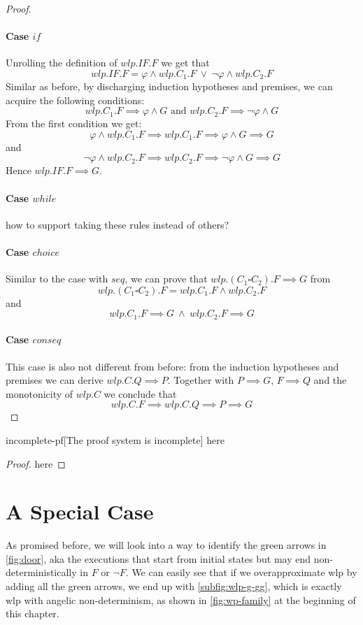 \begin{proof}
	\paragraph{Case $if$}
	Unrolling the definition of $wlp.IF.F$ we get that 
	$$wlp.IF.F = \varphi\wedge wlp.C_1.F\ \vee\ \neg\varphi\wedge wlp.C_2.F$$ 
	Similar as before, by discharging induction hypotheses and premises, we can acquire the following conditions: 
	$$wlp.C_1.F\implies\varphi\wedge G \text{ and }
	 wlp.C_2.F\implies\neg\varphi\wedge G $$
	From the first condition we get: 
	$$\varphi\wedge wlp.C_1.F\implies wlp.C_1.F \implies \varphi\wedge G\implies G$$
	and 
	$$\neg\varphi\wedge wlp.C_2.F\implies wlp.C_2.F \implies \neg\varphi\wedge G\implies G$$
	Hence $wlp.IF.F \implies G$. 
	\paragraph{Case $while$}
	\colorbox{red!30}{
		how to support taking these rules instead of others? 
	}%
	\paragraph{Case $choice$} Similar to the case with $seq$, we can prove that $wlp.(C_1\square C_2).F \implies G$ from 
	$$wlp.(C_1\square C_2).F = wlp.C_1.F \wedge wlp.C_2.F$$
	and 
	$$wlp.C_1.F \implies G\ \wedge\ wlp.C_2.F \implies G$$

	\paragraph{Case $conseq$}
	This case is also not different from before: from the induction hypotheses and premises we can derive $wlp.C.Q \implies P$. 
	Together with $P\implies G$, $F\implies Q$ and the monotonicity of $wlp.C$ we conclude that 
	$$wlp.C.F\implies wlp.C.Q \implies P \implies G$$
\end{proof}

\begin{lemma}{incomplete-pf}[The proof system is incomplete]
	here 
\end{lemma}

\begin{proof}
	here 
\end{proof}


\section{A Special Case}\label{sec:special} %
As promised before, we will look into a way to identify the green arrows in \autoref{fig:door}, aka the executions that start from initial states but may end non-deterministically in $F$ or $\neg F$. 
We can easily see that if we overapproximate wlp by adding all the green arrows, we end up with \autoref{subfig:wlp-g-gg}, which is exactly wlp with angelic non-determinism, as shown in \autoref{fig:wp-family} at the beginning of this chapter. 

